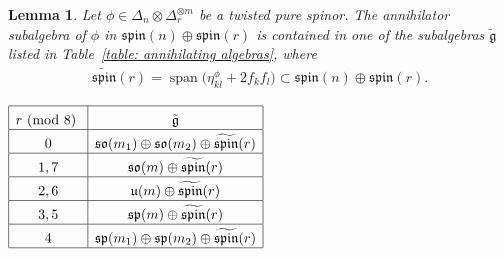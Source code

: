 \documentclass[10pt,a4paper]{amsart}
\numberwithin{equation}{section}
\newtheorem{Lemma}[Theorem]{Lemma}
\begin{document}
\begin{Lemma}\label{lemma:stabilizer} Let $\phi\in\Delta_n\otimes\Delta_r^{\otimes m}$ be a twisted pure spinor. The annihilator subalgebra of $\phi$ in $\mathfrak{spin}(n)\oplus \mathfrak{spin}(r)$ is contained in one of the subalgebras $\tilde{\mathfrak{g}}$ listed in Table~{\rm \ref{table: annihilating algebras}},
where
\begin{gather*}\widetilde{\mathfrak{spin}}(r)=\operatorname{span}\big(\eta_{kl}^\phi+2f_kf_l\big)\subset \mathfrak{spin}(n)\oplus \mathfrak{spin}(r).\end{gather*}
\end{Lemma}

\begin{table}[h!]\centering
$
\begin{array}{|c|c|}
 \hline
 r \mbox{\ {\rm (mod 8)} } & \tilde{\mathfrak{g}}
 \rule{0pt}{3ex}
 \\
 \hline
 0 & \mathfrak{so}(m_1)\oplus\mathfrak{so}(m_2)\oplus \widetilde{\mathfrak{spin}}(r)\rule{0pt}{3ex}\\
 \hline
 1,7 & \mathfrak{so}(m)\oplus \widetilde{\mathfrak{spin}}(r)\rule{0pt}{3ex}\\
\hline
 2,6 & \mathfrak{u}(m)\oplus \widetilde{\mathfrak{spin}}(r)\rule{0pt}{3ex}\\
\hline
 3,5 & \mathfrak{sp}(m)\oplus \widetilde{\mathfrak{spin}}(r)\rule{0pt}{3ex}\\
\hline
 4 & \mathfrak{sp}(m_1)\oplus \mathfrak{sp}(m_2)\oplus \widetilde{\mathfrak{spin}}(r)\rule{0pt}{3ex}\\
\hline
 \end{array}
$
\caption{}\label{table: annihilating algebras}
\end{table}
\end{document}
